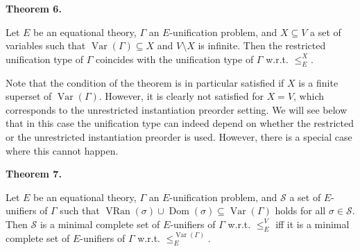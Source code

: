 \documentclass[10pt,a4paper]{amsart}
\begin{document}
 
 
\par\medskip\noindent\textbf{Theorem 6.}\par
 
 
Let $E$ be an equational theory, $\Gamma$ an $E$-unification problem, and $X\subseteq V$ a set of variables such that $\operatorname{Var}(\Gamma)\subseteq X$ and $V\setminus X$ is infinite. Then the restricted unification type of $\Gamma$ coincides with the unification type of $\Gamma$ w.r.t. $\leq_{E}^{X}$.\par
 
 
 
 
Note that the condition of the theorem is in particular satisfied if $X$ is a finite superset of $\operatorname{Var}(\Gamma)$. However, it is clearly not satisfied for $X=V$, which corresponds to the unrestricted instantiation preorder setting. We will see below that in this case the unification type can indeed depend on whether the restricted or the unrestricted instantiation preorder is used. However, there is a special case where this cannot happen.\par
 
 
 
\par\medskip\noindent\textbf{Theorem 7.}\par
 
 
Let $E$ be an equational theory, $\Gamma$ an $E$-unification problem, and $\mathcal{S}$ a set of $E$-unifiers of $\Gamma$ such that $\operatorname{VRan}(\sigma)\cup\operatorname{Dom}(\sigma)\subseteq%
\operatorname{Var}(\Gamma)$ holds for all $\sigma\in\mathcal{S}$. Then $\mathcal{S}$ is a minimal complete set of $E$-unifiers of $\Gamma$ w.r.t. $\leq_{E}^{V}$ iff it is a minimal complete set of $E$-unifiers of $\Gamma$ w.r.t. $\leq_{E}^{\operatorname{Var}(\Gamma)}$.\par
 
 
 
 
\end{document}
